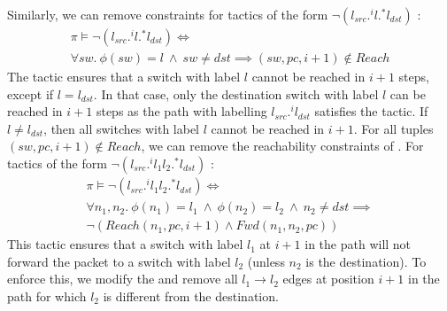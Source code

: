 Similarly, we can remove constraints for tactics
of the form $\neg (l_{src}  .^i l .^* l_{dst})$ :
\begin{multline} \label{eq:t1}
\pi \models \neg (l_{src} .^i l .^* l_{dst}) \Leftrightarrow \\ \forall sw.~ \phi(sw) = l ~\wedge~ sw \not= dst \implies  (sw, pc, i + 1) \notin Reach
\end{multline}
The tactic ensures that a switch with label $l$ cannot be reached in $i+1$
steps, except if $l = l_{dst}$. In that case,
only the destination switch with label $l$ can be reached in $i+1$ steps as 
the path with labelling $l_{src}.^i l_{dst}$ satisfies the tactic. If $l \not= l_{dst}$, then
all switches with label $l$ cannot be reached in $i+1$. For all tuples
$(sw, pc, i+1) \notin Reach$, we can remove the reachability constraints of .
\newline
For tactics of the form $\neg (l_{src}  .^i l_1 l_2 .^* l_{dst})$ : 
\begin{multline} \label{eq:t3}
\pi \models \neg (l_{src} .^i l_1 l_2 .^* l_{dst}) \Leftrightarrow \\ 
\forall n_1, n_2.~\phi(n_1) = l_1~\wedge~ \phi(n_2) = l_2 ~\wedge~ n_2 \not=dst  \implies \\ 
\neg (Reach(n_1, pc, i + 1) \wedge Fwd(n_1, n_2, pc))
\end{multline}
This tactic ensures that a switch with label $l_1$ at $i+1$ in the path
will not forward the packet to a switch with label $l_2$ (unless $n_2$ is the destination). 
To enforce this, we modify the  and remove all $l_1\rightarrow l_2$
edges at position $i+1$ in the path for which $l_2$ is different from the destination.  


